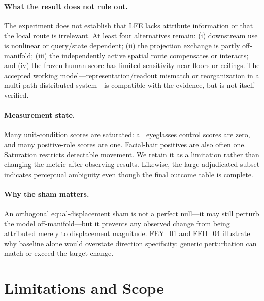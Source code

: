 \documentclass[10pt,twocolumn,letterpaper]{article}
\begin{document}
\paragraph{What the result does not rule out.}
The experiment does not establish that LFE lacks attribute information or that the local route is irrelevant.  At least four alternatives remain: (i) downstream use is nonlinear or query/state dependent; (ii) the projection exchange is partly off-manifold; (iii) the independently active spatial route compensates or interacts; and (iv) the frozen human score has limited sensitivity near floors or ceilings.  The accepted working model—representation/readout mismatch or reorganization in a multi-path distributed system—is compatible with the evidence, but is not itself verified.

\paragraph{Measurement state.}
Many unit-condition scores are saturated: all eyeglasses control scores are zero, and many positive-role scores are one.  Facial-hair positives are also often one.  Saturation restricts detectable movement.  We retain it as a limitation rather than changing the metric after observing results.  Likewise, the large adjudicated subset indicates perceptual ambiguity even though the final outcome table is complete.

\paragraph{Why the sham matters.}
An orthogonal equal-displacement sham is not a perfect null—it may still perturb the model off-manifold—but it prevents any observed change from being attributed merely to displacement magnitude.  FEY\_01 and FFH\_04 illustrate why baseline alone would overstate direction specificity: generic perturbation can match or exceed the target change.

\section{Limitations and Scope}
\label{sec:limitations}
\end{document}
